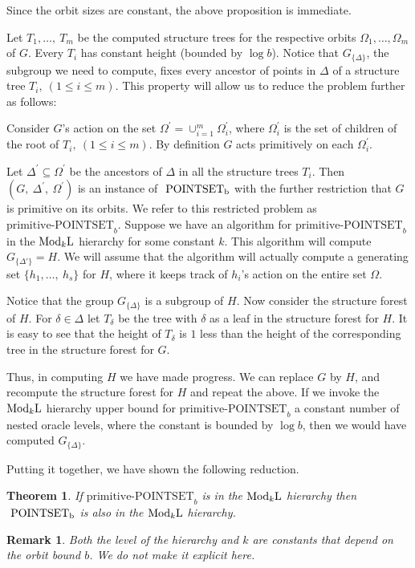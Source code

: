 \documentclass[11pt]{article}
\newtheorem{theorem}{Theorem}[section]
\newtheorem*{remark}{Remark}
\newcommand{\ModkL}{\mbox{\rm Mod$_k$L}}
\newcommand{\psb}[2]{\mbox{\ensuremath{\rm{#1~}{POINTSET}_{#2}}}}
\newcommand{\prpsb}[1]{\ensuremath{\textrm{primitive-POINTSET}_{#1}}}
\begin{document}
Since the orbit sizes are constant, the above proposition is
immediate.

Let $T_1,\ldots,~T_m$ be the computed structure trees for the
respective orbits $\Omega_1,\ldots,\Omega_m$ of $G$. Every $T_i$ has
constant height (bounded by $\log b$). Notice that $G_{\{\Delta\}}$,
the subgroup we need to compute, fixes every ancestor of points in
$\Delta$ of a structure tree $T_i,~(1\leq i\leq m)$. This property
will allow us to reduce the problem further as follows:

Consider $G$'s action on the set
$\Omega^{'}=\cup_{i=1}^m\Omega_i^{'}$, where $\Omega_i^{'}$ is the set
of children of the root of $T_i,~(1\leq i\leq m)$. By definition $G$
acts primitively on each $\Omega_i^{'}$.

Let $\Delta^{'}\subseteq\Omega^{'}$ be the ancestors of $\Delta$ in
all the structure trees $T_i$. Then $(G,~\Delta^{'},~\Omega^{'})$ is
an instance of $\psb{}{b}$ with the further restriction that $G$ is
primitive on its orbits. We refer to this restricted problem as
$\prpsb{b}$. Suppose we have an algorithm for $\prpsb{b}$ in the
$\ModkL$ hierarchy for some constant $k$. This algorithm will compute
$G_{\{\Delta'\}}=H$. We will assume that the algorithm will actually
compute a generating set $\{h_1,\ldots,~h_s\}$ for $H$, where it keeps
track of $h_i$'s action on the entire set $\Omega$.

Notice that the group $G_{\{\Delta\}}$ is a subgroup of $H$.  Now
consider the structure forest of $H$. For $\delta\in\Delta$ let
$T_{\delta}$ be the tree with $\delta$ as a leaf in the structure
forest for $H$. It is easy to see that the height of $T_{\delta}$ is
$1$ less than the height of the corresponding tree in the structure
forest for $G$.

Thus, in computing $H$ we have made progress. We can replace $G$ by
$H$, and recompute the structure forest for $H$ and repeat the above.
If we invoke the $\ModkL$ hierarchy upper bound for $\prpsb{b}$ a
constant number of nested oracle levels, where the constant is bounded
by $\log b$, then we would have computed $G_{\{\Delta\}}$.

Putting it together, we have shown the following reduction.

\begin{theorem}
  If $\prpsb{b}$ is in the $\ModkL$ hierarchy then $\psb{}{b}$ is
  also in the $\ModkL$ hierarchy.
\end{theorem}

\begin{remark} 
Both the level of the hierarchy and $k$ are constants that depend on
the orbit bound $b$. We do not make it explicit here.
\end{remark}
\end{document}
